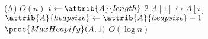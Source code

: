 \begin{codebox}
\li {}(A) 
    \Comment $O(n)$
\li \For $i \gets \attrib{A}{length}$  \To $2$
\li     \Do
            $A[1] \leftrightarrow A[i]$
\li         $\attrib{A}{heapsize} \gets \attrib{A}{heapsize} - 1 $
\li         $\proc{MaxHeapify}(A,1)$
                \Comment $O(\log n)$
        \End
\end{codebox}
